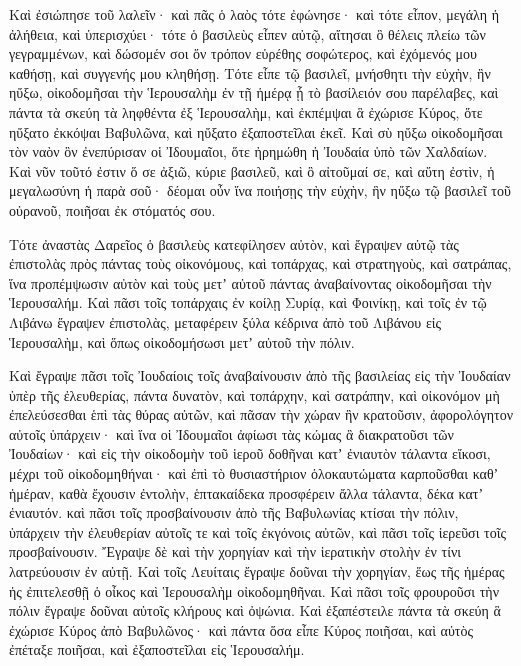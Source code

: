 {\par }{\PP {}Καὶ ἐσιώπησε τοῦ λαλεῖν· καὶ πᾶς ὁ λαὸς τότε ἐφώνησε· καὶ τότε εἶπον, μεγάλη ἡ ἀλήθεια, καὶ ὑπερισχύει·
τότε ὁ βασιλεὺς εἶπεν αὐτῷ, αἴτησαι ὃ θέλεις πλείω τῶν γεγραμμένων, καὶ δώσομέν σοι ὅν τρόπον εὑρέθης σοφώτερος, καὶ ἐχόμενός μου καθήσῃ, καὶ συγγενής μου κληθήσῃ.
Τότε εἶπε τῷ βασιλεῖ, μνήσθητι τὴν εὐχὴν, ἣν ηὔξω, οἰκοδομῆσαι τὴν Ἱερουσαλὴμ ἐν τῇ ἡμέρᾳ ᾗ τὸ βασίλειόν σου παρέλαβες,
καὶ πάντα τὰ σκεύη τὰ ληφθέντα ἐξ Ἱερουσαλὴμ, καὶ ἐκπέμψαι ἃ ἐχώρισε Κύρος, ὅτε ηὔξατο ἐκκόψαι Βαβυλῶνα, καὶ ηὔξατο ἐξαποστεῖλαι ἐκεῖ.
Καὶ σὺ ηὔξω οἰκοδομῆσαι τὸν ναὸν ὃν ἐνεπύρισαν οἱ Ἰδουμαῖοι, ὅτε ἠρημώθη ἡ Ἰουδαία ὑπὸ τῶν Χαλδαίων.
Καὶ νῦν τοῦτό ἐστιν ὅ σε ἀξιῶ, κύριε βασιλεῦ, καὶ ὃ αἰτοῦμαί σε, καὶ αὕτη ἐστὶν, ἡ μεγαλωσύνη ἡ παρὰ σοῦ· δέομαι οὖν ἵνα ποιήσῃς τὴν εὐχὴν, ἣν ηὔξω τῷ βασιλεῖ τοῦ οὐρανοῦ, ποιῆσαι ἐκ στόματός σου.
\par }{\PP {}Τότε ἀναστὰς Δαρεῖος ὁ βασιλεὺς κατεφίλησεν αὐτὸν, καὶ ἔγραψεν αὐτῷ τὰς ἐπιστολὰς πρὸς πάντας τοὺς οἰκονόμους, καὶ τοπάρχας, καὶ στρατηγοὺς, καὶ σατράπας, ἵνα προπέμψωσιν αὐτὸν καὶ τοὺς μετʼ αὐτοῦ πάντας ἀναβαίνοντας οἰκοδομῆσαι τὴν Ἱερουσαλήμ.
Καὶ πᾶσι τοῖς τοπάρχαις ἐν κοίλῃ Συρίᾳ, καὶ Φοινίκῃ, καὶ τοῖς ἐν τῷ Λιβάνω ἔγραψεν ἐπιστολὰς, μεταφέρειν ξύλα κέδρινα ἀπὸ τοῦ Λιβάνου εἰς Ἱερουσαλὴμ, καὶ ὅπως οἰκοδομήσωσι μετʼ αὐτοῦ τὴν πόλιν.
\par }{\PP {}Καὶ ἔγραψε πᾶσι τοῖς Ἰουδαίοις τοῖς ἀναβαίνουσιν ἀπὸ τῆς βασιλείας εἰς τὴν Ἰουδαίαν ὑπὲρ τῆς ἐλευθερίας, πάντα δυνατὸν, καὶ τοπάρχην, καὶ σατράπην, καὶ οἰκονόμον μὴ ἐπελεύσεσθαι ἑπὶ τὰς θύρας αὐτῶν,
καὶ πᾶσαν τὴν χώραν ἣν κρατοῦσιν, ἀφορολόγητον αὐτοῖς ὑπάρχειν· καὶ ἵνα οἱ Ἰδουμαῖοι ἀφίωσι τὰς κώμας ἃ διακρατοῦσι τῶν Ἰουδαίων·
καὶ εἰς τὴν οἰκοδομὴν τοῦ ἱεροῦ δοθῆναι κατʼ ἐνιαυτὸν τάλαντα εἴκοσι, μέχρι τοῦ οἰκοδομηθήναι·
καὶ ἐπὶ τὸ θυσιαστήριον ὁλοκαυτώματα καρποῦσθαι καθʼ ἡμέραν, καθὰ ἔχουσιν ἐντολὴν, ἑπτακαίδεκα προσφέρειν ἄλλα τάλαντα, δέκα κατʼ ἐνιαυτόν.
καὶ πᾶσι τοῖς προσβαίνουσιν ἀπὸ τῆς Βαβυλωνίας κτίσαι τὴν πόλιν, ὑπάρχειν τὴν ἐλευθερίαν αὐτοῖς τε καὶ τοῖς ἐκγόνοις αὐτῶν, καὶ πᾶσι τοῖς ἱερεῦσι τοῖς προσβαίνουσιν.
Ἔγραψε δὲ καὶ τὴν χορηγίαν καὶ τὴν ἱερατικὴν στολὴν ἐν τίνι λατρεύουσιν ἐν αὐτῇ.
Καὶ τοῖς Λευίταις ἔγραψε δοῦναι τὴν χορηγίαν, ἕως τῆς ἡμέρας ἡς ἐπιτελεσθῇ ὁ οἶκος καὶ Ἱερουσαλὴμ οἰκοδομηθῆναι.
Καὶ πᾶσι τοῖς φρουροῦσι τὴν πόλιν ἔγραψε δοῦναι αὐτοῖς κλήρους καὶ ὀψώνια.
Καὶ ἐξαπέστειλε πάντα τὰ σκεύη ἃ ἐχώρισε Κύρος ἀπὸ Βαβυλῶνος· καὶ πάντα ὅσα εἶπε Κύρος ποιῆσαι, καὶ αὐτὸς ἐπέταξε ποιῆσαι, καὶ ἐξαποστεῖλαι εἰς Ἱερουσαλήμ.
}

